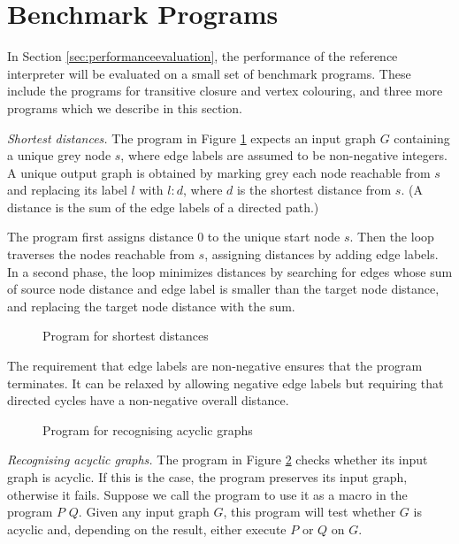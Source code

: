 \section{Benchmark Programs}
\label{sec:benchmark}
 
In Section \ref{sec:performanceevaluation}, the performance of the reference interpreter will be evaluated on a small set of benchmark programs. These include the programs for transitive closure and vertex colouring, and three more programs which we describe in this section.

\vspace{.5\baselineskip}
\noindent
\emph{Shortest distances.} The program in Figure \ref{fig:shortest-distances} expects an input graph $G$\/ containing a unique grey node $s$, where edge labels are assumed to be non-negative integers. A unique output graph is obtained by marking grey each node reachable from $s$ and replacing its label $l$\/ with $l{:}d$, where $d$\/ is the shortest distance from $s$. (A distance is the sum of the edge labels of a directed path.)
  
The program first assigns distance 0 to the unique start node $s$. Then the loop  traverses the nodes reachable from $s$, assigning distances by adding edge labels. In a second phase, the loop  minimizes distances by searching for edges whose sum of source node distance and edge label is smaller than the target node distance, and replacing the target node distance with the sum.

\begin{figure}[t]
\begin{center}

\end{center}
\caption{Program for shortest distances}\label{fig:shortest-distances}
\end{figure}

The requirement that edge labels are non-negative ensures that the program terminates. It can be relaxed by allowing negative edge labels but requiring that directed cycles have a non-negative overall distance.

\begin{figure}[t]
\begin{center}

\end{center}
\caption{Program for recognising acyclic graphs}\label{fig:acyclicity}
\end{figure}
\vspace{.5\baselineskip}
\noindent
\emph{Recognising acyclic graphs.} The program in Figure \ref{fig:acyclicity} checks whether its input graph is acyclic. If this is the case, the program preserves its input graph, otherwise it fails. Suppose we call the program  to use it as a macro in the program    $P$  $Q$. Given any input graph $G$, this program will test whether $G$\/ is acyclic and, depending on the result, either execute $P$ or $Q$ on $G$.  
  
